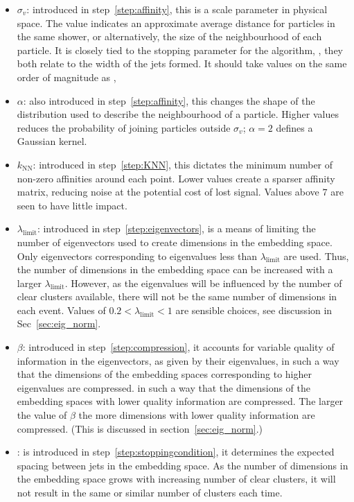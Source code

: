 \begin{itemize}
    \item \(\sigma_v\): introduced in step~\ref{step:affinity}, this is a scale parameter in physical space.
                      The value indicates an approximate average distance for particles in the same shower,
                      or alternatively, the size of the neighbourhood of each particle.
                      It is closely tied to the stopping parameter for the \genkt{} algorithm,
                      \ktstoppingdeltar{},
                      they both relate to the width of the jets formed.
                      It should take values on the same order of magnitude as \ktstoppingdeltar{},
    \item  \(\alpha\): also introduced in step~\ref{step:affinity},
           this changes the shape of the distribution used to describe the neighbourhood of a particle.
           Higher values reduces the probability of joining particles outside \(\sigma_v\);
           \(\alpha=2\) defines a Gaussian kernel.
       \item \(k_\text{NN}\): introduced in step~\ref{step:KNN}, this dictates the minimum number of non-zero affinities around each point.
           Lower values create a sparser affinity matrix, reducing noise at the potential cost of lost signal.
           Values above \(7\) are seen to have little impact.
       \item  \(\lambda_\text{limit}\): introduced in step~\ref{step:eigenvectors}, is a means of limiting the number of eigenvectors used
           to create dimensions in the embedding space.
           Only eigenvectors corresponding to eigenvalues less than \(\lambda_\text{limit}\) are used.
           Thus, the number of dimensions in the embedding space can be increased with a larger \(\lambda_\text{limit}\). 
           However, as the eigenvalues will be influenced by the number of clear clusters available, 
           there will not be the same number of dimensions in each event.
           Values of \(0.2 <\lambda_\text{limit} < 1\) are sensible choices,
           see discussion in Sec~\ref{sec:eig_norm}.
       \item  \(\beta\): introduced in step~\ref{step:compression}, it 
          accounts for variable quality of information in the eigenvectors, as given by their eigenvalues,
        in such a way that the dimensions of the embedding spaces 
        corresponding to higher eigenvalues are compressed.
        in such a way that the dimensions of the embedding spaces with lower
        quality information are compressed.
        The larger the value of \(\beta\) the more dimensions with
        lower quality information are compressed.
        (This is discussed in section~\ref{sec:eig_norm}.)
    \item \stoppingdeltar{}: is introduced in step~\ref{step:stoppingcondition}, it
         determines the expected spacing between jets in the embedding space.
         As the number of dimensions in the embedding space grows with increasing 
         number of clear clusters, it will not result in the same or
         similar number of clusters each time.

\end{itemize}


